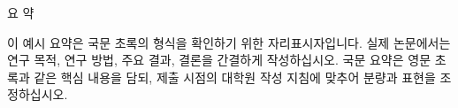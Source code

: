 \clearpage
\thispagestyle{empty}

\begin{center}

    {\fontsize{20pt}{24pt}\selectfont
        \ThesisTitleKr \par}

    \vspace{1.6cm}

    {\fontsize{14pt}{16pt}\selectfont
        \ThesisAuthorKr \par}

    \vspace{0.4cm}

    {\fontsize{14pt}{24pt}
        \selectfont
        \ThesisSchoolKr \par
        \ThesisUniversityKr \par
    }

    \vspace{1.0cm}

    {\fontsize{14pt}{16pt}\selectfont 요 \hspace{1cm} 약 \par}

\end{center}

\noindent
이 예시 요약은 국문 초록의 형식을 확인하기 위한 자리표시자입니다. 실제 논문에서는 연구 목적, 연구 방법, 주요 결과, 결론을 간결하게 작성하십시오. 국문 요약은 영문 초록과 같은 핵심 내용을 담되, 제출 시점의 대학원 작성 지침에 맞추어 분량과 표현을 조정하십시오.

